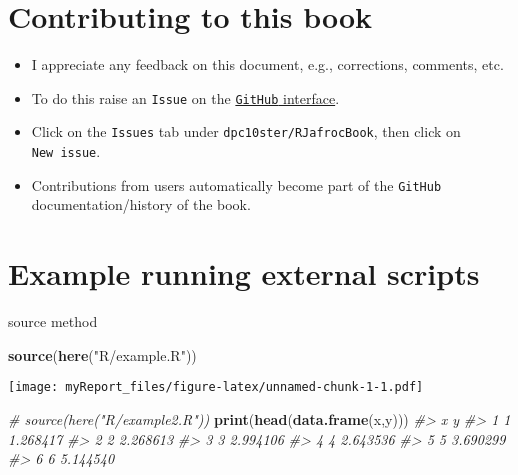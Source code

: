 \documentclass[
]{book}
\newenvironment{Shaded}{\begin{snugshade}}{\end{snugshade}}
\newcommand{\CommentTok}[1]{\textcolor[rgb]{0.56,0.35,0.01}{\textit{#1}}}
\newcommand{\KeywordTok}[1]{\textcolor[rgb]{0.13,0.29,0.53}{\textbf{#1}}}
\newcommand{\NormalTok}[1]{#1}
\newcommand{\StringTok}[1]{\textcolor[rgb]{0.31,0.60,0.02}{#1}}
\providecommand{\tightlist}{%
  \setlength{\itemsep}{0pt}\setlength{\parskip}{0pt}}
\begin{document}
\hypertarget{contributing-to-this-book}{%
\chapter*{Contributing to this book}\label{contributing-to-this-book}}

\begin{itemize}
\tightlist
\item
  I appreciate any feedback on this document, e.g., corrections, comments, etc.\\
\item
  To do this raise an \texttt{Issue} on the \href{https://github.com/dpc10ster/RJafrocBook}{\texttt{GitHub} interface}.
\item
  Click on the \texttt{Issues} tab under \texttt{dpc10ster/RJafrocBook}, then click on \texttt{New\ issue}.
\item
  Contributions from users automatically become part of the \texttt{GitHub} documentation/history of the book.
\end{itemize}

\hypertarget{example-running-external-scripts}{%
\chapter{Example running external scripts}\label{example-running-external-scripts}}

source method

\begin{Shaded}
\begin{Highlighting}[]
\KeywordTok{source}\NormalTok{(}\KeywordTok{here}\NormalTok{(}\StringTok{"R/example.R"}\NormalTok{))}
\end{Highlighting}
\end{Shaded}

\texttt{[image: myReport\_files/figure-latex/unnamed-chunk-1-1.pdf]}

\begin{Shaded}
\begin{Highlighting}[]
\CommentTok{\# source(here("R/example2.R"))}
\KeywordTok{print}\NormalTok{(}\KeywordTok{head}\NormalTok{(}\KeywordTok{data.frame}\NormalTok{(x,y)))}
\CommentTok{\#\textgreater{}   x        y}
\CommentTok{\#\textgreater{} 1 1 1.268417}
\CommentTok{\#\textgreater{} 2 2 2.268613}
\CommentTok{\#\textgreater{} 3 3 2.994106}
\CommentTok{\#\textgreater{} 4 4 2.643536}
\CommentTok{\#\textgreater{} 5 5 3.690299}
\CommentTok{\#\textgreater{} 6 6 5.144540}
\end{Highlighting}
\end{Shaded}
\end{document}
